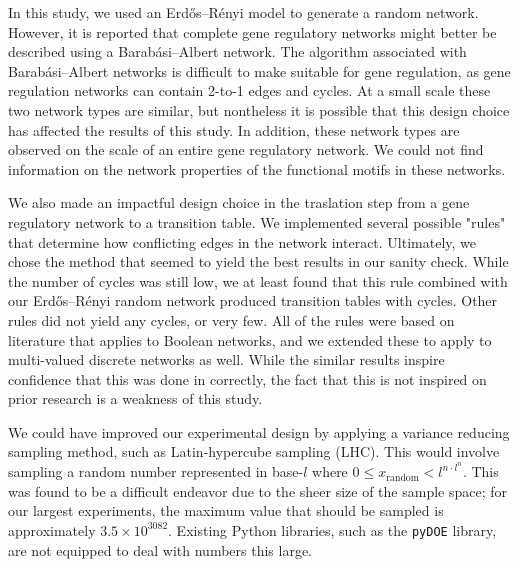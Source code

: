 \documentclass[../main.tex]{subfiles}
\begin{document}

In this study, we used an Erdős–Rényi model to generate a random network.
However, it is reported that complete gene regulatory networks might better be described using a Barabási–Albert network.
The algorithm associated with Barabási–Albert networks is difficult to make suitable for gene regulation, as gene regulation networks can contain 2-to-1 edges and cycles.
At a small scale these two network types are similar, but nontheless it is possible that this design choice has affected the results of this study.
In addition, these network types are observed on the scale of an entire gene regulatory network.
We could not find information on the network properties of the functional motifs in these networks.

We also made an impactful design choice in the traslation step from a gene regulatory network to a transition table.
We implemented several possible "rules" that determine how conflicting edges in the network interact.
Ultimately, we chose the method that seemed to yield the best results in our sanity check.
While the number of cycles was still low, we at least found that this rule combined with our Erdős–Rényi random network produced transition tables with cycles.
Other rules did not yield any cycles, or very few.
All of the rules were based on literature that applies to Boolean networks, and we extended these to apply to multi-valued discrete networks as well.
While the similar results inspire confidence that this was done in correctly, the fact that this is not inspired on prior research is a weakness of this study.

We could have improved our experimental design by applying a variance reducing sampling method, such as Latin-hypercube sampling (LHC).
This would involve sampling a random number represented in base-$l$ where $0 \le x_\mathrm{random} < l^{n \cdot l^n}$.
This was found to be a difficult endeavor due to the sheer size of the sample space; for our largest experiments, the maximum value that should be sampled is approximately $3.5 \times 10^{3082}$.
Existing Python libraries, such as the \texttt{pyDOE} library, are not equipped to deal with numbers this large.
\end{document}
